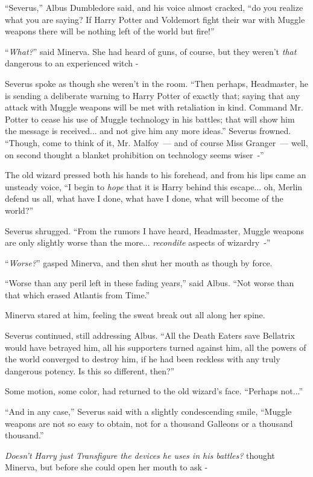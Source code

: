 ``Severus,'' Albus Dumbledore said, and his voice almost cracked, ``do you realize what you are saying? If Harry Potter and Voldemort fight their war with Muggle weapons there will be nothing left of the world but fire!''

``\emph{What?}'' said Minerva. She had heard of guns, of course, but they weren't \emph{that} dangerous to an experienced witch -

Severus spoke as though she weren't in the room. ``Then perhaps, Headmaster, he is sending a deliberate warning to Harry Potter of exactly that; saying that any attack with Muggle weapons will be met with retaliation in kind. Command Mr. Potter to cease his use of Muggle technology in his battles; that will show him the message is received... and not give him any more ideas.'' Severus frowned. ``Though, come to think of it, Mr. Malfoy~--- and of course Miss Granger~--- well, on second thought a blanket prohibition on technology seems wiser~-''

The old wizard pressed both his hands to his forehead, and from his lips came an unsteady voice, ``I begin to \emph{hope} that it is Harry behind this escape... oh, Merlin defend us all, what have I done, what have I done, what will become of the world?''

Severus shrugged. ``From the rumors I have heard, Headmaster, Muggle weapons are only slightly worse than the more... \emph{recondite} aspects of wizardry~-''

``\emph{Worse?}'' gasped Minerva, and then shut her mouth as though by force.

``Worse than any peril left in these fading years,'' said Albus. ``Not worse than that which erased Atlantis from Time.''

Minerva stared at him, feeling the sweat break out all along her spine.

Severus continued, still addressing Albus. ``All the Death Eaters save Bellatrix would have betrayed him, all his supporters turned against him, all the powers of the world converged to destroy him, if he had been reckless with any truly dangerous potency. Is this so different, then?''

Some motion, some color, had returned to the old wizard's face. ``Perhaps not...''

``And in any case,'' Severus said with a slightly condescending smile, ``Muggle weapons are not so easy to obtain, not for a thousand Galleons or a thousand thousand.''

\emph{Doesn't Harry just Transfigure the devices he uses in his battles?} thought Minerva, but before she could open her mouth to ask -

